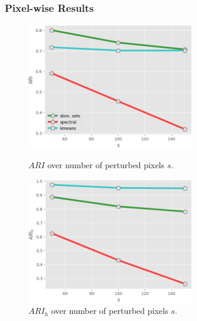 \documentclass{beamer}
\begin{document}
\begin{frame}
	\frametitle{Pixel-wise Results}
\begin{figure}[H]
	\begin{minipage}[t]{0.48\linewidth}
		\centering
		\includegraphics[width=0.65\textwidth]{img/advpixel/rows_ARI.png}
		\caption{\footnotesize $ARI$ over number of perturbed pixels $s$.}
	\end{minipage}        
	\hspace{.1cm}
	\begin{minipage}[t]{0.48\linewidth}
		\centering
		\includegraphics[width=0.65\textwidth]{img/advpixel/rows_ARIh.png}
		\caption{\footnotesize $ARI_h$ over number of perturbed pixels $s$.}
	\end{minipage}
\end{figure}


\end{frame}
\end{document}
